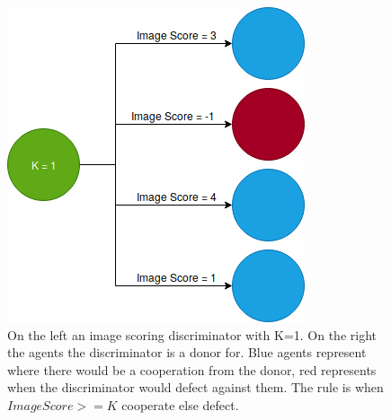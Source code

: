 \documentclass[]{final_report}
\begin{document}
\begin{figure}
\vspace{-20pt}
\begin{framed}
	\center
	\includegraphics[width=\textwidth]{Image_Scoring.png}
	\caption{On the left an image scoring discriminator with K=1. On the right the agents the discriminator is a donor for. Blue agents represent where there would be a cooperation from the donor, red represents when the discriminator would defect against them. The rule is when $Image Score >= K$ cooperate else defect.}
	\label{fig:image_discriminator}
\end{framed}
\vspace{-50pt}
\end{figure}
\end{document}

